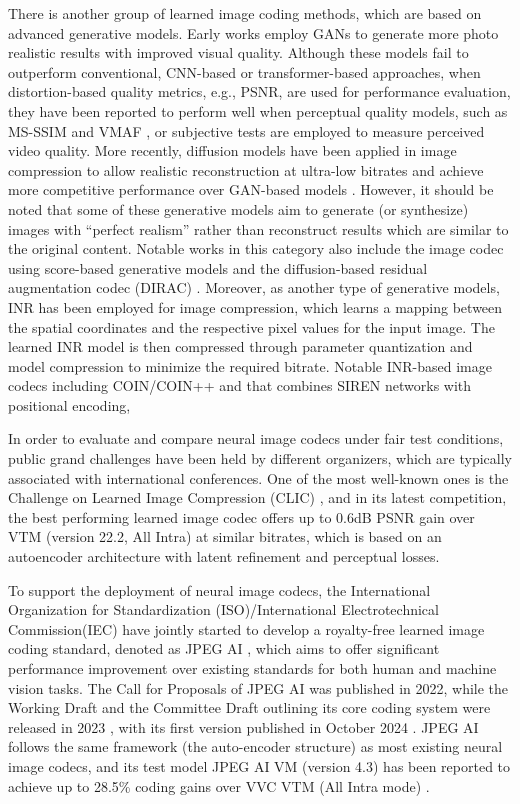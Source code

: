 \documentclass[11pt,a4paper]{article}
\begin{document}
There is another group of learned image coding methods, which are based on advanced generative models. Early works \cite{agustsson2019generative,mentzer2020high} employ GANs to generate more photo realistic results with improved visual quality. Although these models fail to outperform conventional, CNN-based or transformer-based approaches, when distortion-based quality metrics, e.g., PSNR, are used for performance evaluation, they have been reported to perform well when perceptual quality models, such as MS-SSIM \cite{Bovik_MSSSIM} and VMAF \cite{VMAFblog}, or subjective tests are employed to measure perceived video quality. More recently, diffusion models have been applied in image compression to allow realistic reconstruction at ultra-low bitrates \cite{careil2023towards} and achieve more competitive performance over GAN-based models \cite{yang2024lossy}. However, it should be noted that some of these generative models aim to generate (or synthesize) images with ``perfect realism'' rather than reconstruct results which are similar to the original content. Notable works in this category also include the image codec using score-based generative models \cite{hoogeboom2023high} and the diffusion-based residual augmentation codec (DIRAC) \cite{ghouse2023residual}. Moreover, as another type of generative models, INR has been employed for image compression, which learns a mapping between the spatial coordinates and the respective pixel values for the input image. The learned INR model is then compressed through parameter quantization and model compression to minimize the required bitrate. Notable INR-based image codecs including COIN/COIN++ \cite{dupont2021coin,dupontcoin++} and \cite{strumpler2022implicit} that combines SIREN networks \cite{sitzmann2020implicit} with positional encoding,   

In order to evaluate and compare neural image codecs under fair test conditions, public grand challenges have been held by different organizers, which are typically associated with international conferences. One of the most well-known ones is the Challenge on Learned Image Compression (CLIC) \cite{clic}, and in its latest competition, the best performing learned image codec offers up to 0.6dB PSNR gain over VTM (version 22.2, All Intra) at similar bitrates, which is based on an autoencoder architecture with latent refinement and perceptual losses. 

To support the deployment of neural image codecs, the International Organization for Standardization (ISO)/International Electrotechnical Commission(IEC) have jointly started to develop a royalty-free learned image coding standard, denoted as JPEG AI \cite{ascenso2023jpeg}, which aims to offer significant performance improvement over existing standards for both human and machine vision tasks. The Call for Proposals of JPEG AI was published in 2022, while the Working Draft and the Committee Draft outlining its core coding system were released in 2023 \cite{JPEGAIN100634}, with its first version published in October 2024 \cite{JPEGAIN100634}. JPEG AI follows the same framework (the auto-encoder structure) as most existing neural image codecs, and its test model JPEG AI VM (version 4.3) has been reported to achieve up to 28.5\% coding gains over VVC VTM (All Intra mode) \cite{JPEGAIM101081}.
\end{document}
